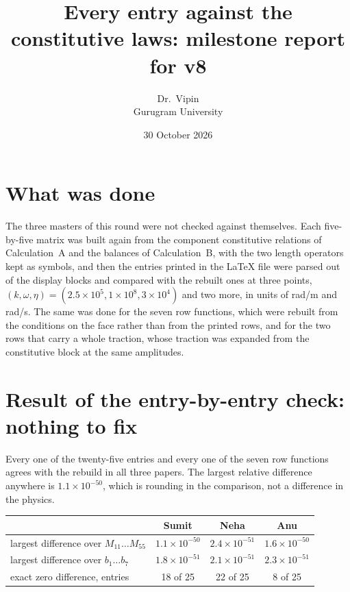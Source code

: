 \documentclass[11pt,a4paper]{article}
\title{\vspace{-1.4cm}\Large Every entry against the constitutive laws: milestone report for v8}
\author{Dr.\ Vipin\\ Gurugram University}
\date{30 October 2026}
\begin{document}
\maketitle
\vspace{-7mm}

\section*{What was done}

The three masters of this round were not checked against themselves. Each five-by-five matrix was
built again from the component constitutive relations of Calculation~A and the balances of
Calculation~B, with the two length operators kept as symbols, and then the entries printed in the
\LaTeX{} file were parsed out of the display blocks and compared with the rebuilt ones at three
points, $(k,\omega,\eta)=(2.5\times10^5,1\times10^8,3\times10^4)$ and two more, in units of
rad/m and rad/s. The same was done for the seven row functions, which were rebuilt from the
conditions on the face rather than from the printed rows, and for the two rows that carry a whole
traction, whose traction was expanded from the constitutive block at the same amplitudes.

\section*{Result of the entry-by-entry check: nothing to fix}

Every one of the twenty-five entries and every one of the seven row functions agrees with the
rebuild in all three papers. The largest relative difference anywhere is $1.1\times10^{-50}$, which
is rounding in the comparison, not a difference in the physics.

\begin{center}\footnotesize
\begin{tabular}{lccc}
\toprule
& Sumit & Neha & Anu\\
\midrule
largest difference over $M_{11}\ldots M_{55}$ & $1.1\times10^{-50}$ & $2.4\times10^{-51}$ & $1.6\times10^{-50}$\\
largest difference over $b_1\ldots b_7$ & $1.8\times10^{-51}$ & $2.1\times10^{-51}$ & $2.3\times10^{-51}$\\
exact zero difference, entries & 18 of 25 & 22 of 25 & 8 of 25\\
\bottomrule
\end{tabular}
\end{center}
\end{document}
